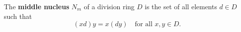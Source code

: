 The \textbf{middle nucleus} $N_m$ of a division ring $D$ is the set of all elements $d \in D$ such that
$$(xd)y = x(dy) \quad \text{for all } x, y \in D.$$
